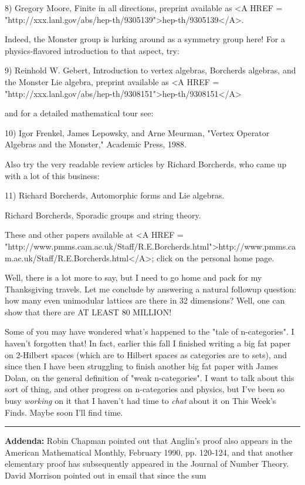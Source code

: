 8) Gregory Moore, Finite in all directions, preprint available
as <A HREF = "http://xxx.lanl.gov/abs/hep-th/9305139">hep-th/9305139</A>.
 
Indeed, the Monster group is lurking around as a symmetry group here!
For a physics-flavored introduction to that aspect, try:

9) Reinhold W. Gebert, Introduction to vertex algebras,
Borcherds algebras, and the Monster Lie algebra, preprint 
available as <A HREF = "http://xxx.lanl.gov/abs/hep-th/9308151">hep-th/9308151</A>

and for a detailed mathematical tour see:

10) Igor Frenkel, James Lepowsky, and Arne Meurman, "Vertex Operator 
Algebras and the Monster," Academic Press, 1988.  

Also try the very readable review articles by Richard Borcherds, who
came up with a lot of this business:

11) Richard Borcherds, Automorphic forms and Lie algebras.

Richard Borcherds, Sporadic groups and string theory.   

These and other papers available at 
<A HREF =
"http://www.pmms.cam.ac.uk/Staff/R.E.Borcherds.html">http://www.pmms.cam.ac.uk/Staff/R.E.Borcherds.html</A>;
click on the personal home page.

Well, there is a lot more to say, but I need to go home and pack
for my Thanksgiving travels.   Let me conclude by answering a natural
followup question: how many even unimodular lattices are there in 
32 dimensions?  Well, one can show that there are AT LEAST 80 MILLION!

Some of you may have wondered what's
happened to the "tale of n-categories".  I haven't forgotten that!
In fact, earlier this fall I finished writing a big fat paper on 
2-Hilbert spaces (which are to Hilbert spaces as categories are to
sets), and since then I have been struggling to finish another big
fat paper with James Dolan, on the general definition of "weak 
n-categories".  I want to talk about this sort of thing, and other
progress on n-categories and physics, but I've been so busy \emph{working}
on it that I haven't had time to \emph{chat} about it on This Week's Finds.
Maybe soon I'll find time.
\par\noindent\rule{\textwidth}{0.4pt}
\textbf{Addenda:} Robin Chapman pointed out that Anglin's proof also
appears in the American Mathematical Monthly, February 1990, pp. 120-124,
and that another elementary proof has subsequently appeared in the Journal 
of Number Theory.  David Morrison pointed out in email that since
the sum

